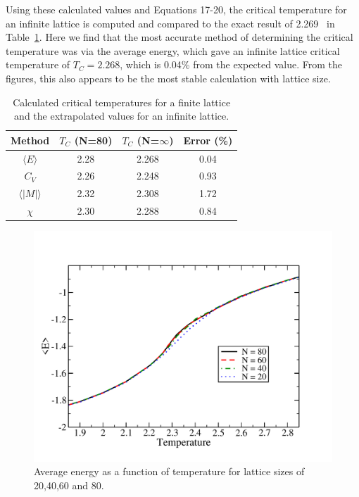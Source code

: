 \documentclass[prc,amsmath,twocolumn,superscriptaddress]{revtex4}
\begin{document}
Using these calculated values and Equations 17-20, the critical temperature for an infinite lattice is computed and compared to the exact result of 2.269~\cite{?} in Table~\ref{comp}. Here we find that the most accurate method of determining the critical temperature was via the average energy, which gave an infinite lattice critical temperature of $T_C=2.268$, which is 0.04\% from the expected value. From the figures, this also appears to be the most stable calculation with lattice size.

\begin{table}[b]
\centering
\begin{tabular}{|c|c|c|c|}
\hline
Method&$T_C$ (N=80) &$T_C$ (N=$\infty$)&Error (\%) \\
\hline
$\langle E\rangle$&2.28&2.268 &0.04\\
$C_V$ &2.26&2.248&0.93\\
$\langle |M|\rangle$&2.32& 2.308&1.72\\
$\chi$&2.30&2.288&0.84\\
\hline
\end{tabular}
\caption{Calculated critical temperatures for a finite lattice and the extrapolated values for an infinite lattice.}
\label{comp}
\end{table}

\begin{figure}[t]
\includegraphics[scale=0.33]{avg_energy.pdf}
\caption{Average energy as a function of temperature for lattice sizes of 20,40,60 and 80.}
\label{avg_e}
\end{figure}
\end{document}
